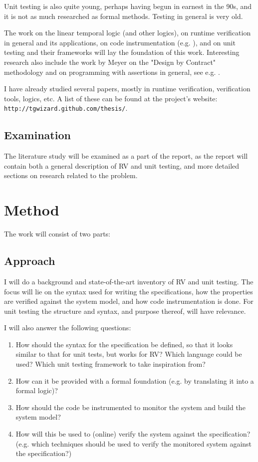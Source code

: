 \documentclass[a4paper,11pt]{article}
\begin{document}
Unit testing is also quite young, perhaps having begun in earnest in the 90s, and it is not as much researched as formal methods. Testing in general is very old.

The work on the linear temporal logic (and other logics), on runtime verification in general and its applications, on code instrumentation (e.g. \cite{aspectj,matusiak09}), and on unit testing and their frameworks will lay the foundation of this work. Interesting research also include the work by Meyer on the "Design by Contract" methodology \cite{meyer92} and on programming with assertions in general, see e.g. \cite{rosenblum95,bartetzko01}.

I have already studied several papers, mostly in runtime verification, verification tools, logics, etc.
A list of these can be found at the project's website: \texttt{http://tgwizard.github.com/thesis/}.

\subsection{Examination}

The literature study will be examined as a part of the report, as the report will contain
both a general description of RV and unit testing, and more detailed sections on research related to the problem.


\section{Method}

The work will consist of two parts:


\subsection{Approach}

I will do a background and state-of-the-art inventory of RV and unit testing.
The focus will lie on the syntax used for writing the specifications, how the
properties are verified against the system model, and how code instrumentation
is done. For unit testing the structure and syntax, and purpose thereof, will
have relevance.

I will also answer the following questions:

\begin{enumerate}
	\item How should the syntax for the specification be defined,
		so that it looks similar to that for unit tests, but works for RV?
		Which language could be used? Which unit testing framework to take inspiration from?
    \item How can it be provided with a formal foundation (e.g. by translating
        it into a formal logic)?
	\item How should the code be instrumented to monitor the system and build the system model?
	\item How will this be used to (online) verify the system against the
        specification? (e.g. which techniques should be used to verify the
        monitored system against the specification?)
\end{enumerate}
\end{document}
